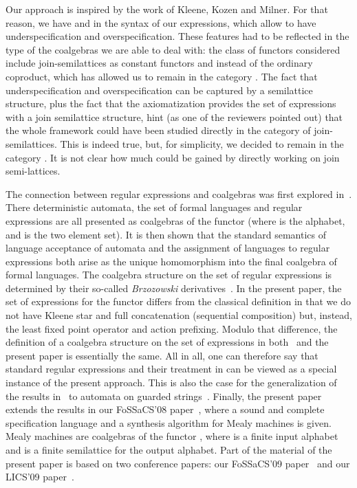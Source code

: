 \documentclass{LMCS}
\theoremstyle{definition}
\theoremstyle{plain}
\theoremstyle{plain}
\theoremstyle{plain}
\theoremstyle{plain}
\theoremstyle{definition}
\theoremstyle{definition}
\begin{document}
Our approach is inspired by the work of Kleene, Kozen and Milner. For that
reason, we have  and  in the syntax of our
expressions, which allow to have underspecification and
overspecification. These features had to be reflected in the type of
the coalgebras we are able to deal with: the class of functors
considered include join-semilattices as constant functors and
 instead of the ordinary coproduct, which has allowed us to
remain in the category . The fact that underspecification and
overspecification can be captured by a semilattice structure, plus the
fact that the axiomatization provides the set of expressions with a
join semilattice structure, hint (as one of the reviewers pointed out)
that the whole framework could have been studied directly in the
category of join-semilattices. This is indeed true, but, for
simplicity, we decided to remain in the category . It is
not clear how much could be gained by directly working on join
semi-lattices. 

The connection between regular expressions and coalgebras was first
explored in~\cite{Rut98c}. There deterministic  automata, the set of formal languages
and regular expressions are all presented as coalgebras of the
functor  (where  is the alphabet, and  is the
two element set). It is then shown that the standard semantics of
language acceptance of automata and the assignment of languages to
regular expressions both arise as the unique homomorphism into the
final coalgebra of formal languages. The coalgebra structure on the
set of regular expressions is determined by their so-called {\em
Brzozowski} derivatives~\cite{Brz64}. In the present paper, the set
of expressions for the functor  differs from
the classical definition in that we do not have Kleene star and full
concatenation (sequential composition) but, instead, the least fixed
point operator and action prefixing. Modulo that difference, the
definition of a coalgebra structure on the set of expressions in
both~\cite{Rut98c} and the present paper is essentially the same.
All in all, one can therefore say that standard regular expressions
and their treatment in \cite{Rut98c} can be viewed as a special
instance of the present approach. This is also the case for the
generalization of the results in~\cite{Rut98c} to automata on guarded
strings~\cite{kozen08}. Finally, the present paper extends the results
in our FoSSaCS'08 paper~\cite{BRS08},
where a sound and complete specification language and a synthesis
algorithm for Mealy machines is given. Mealy machines are coalgebras
of the functor , where  is a finite input
alphabet and  is a finite semilattice for the output alphabet. Part of the material of the present paper is based on two conference papers: our FoSSaCS'09 paper~\cite{regexp} and our LICS'09 paper~\cite{BRS09b}.
\end{document}
